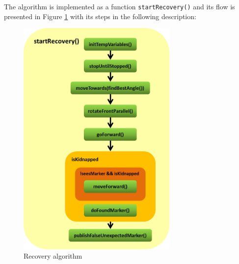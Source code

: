The algorithm is implemented as a function \texttt{startRecovery()} and its flow is presented in Figure \ref{start_recovery} with its steps in the following description:

\begin{figure}[ht]
\centering
\includegraphics[width=0.7\textwidth]{graphics/start_recovery.png}
\caption{Recovery algorithm}
\label{start_recovery}
\centering
\end{figure}

